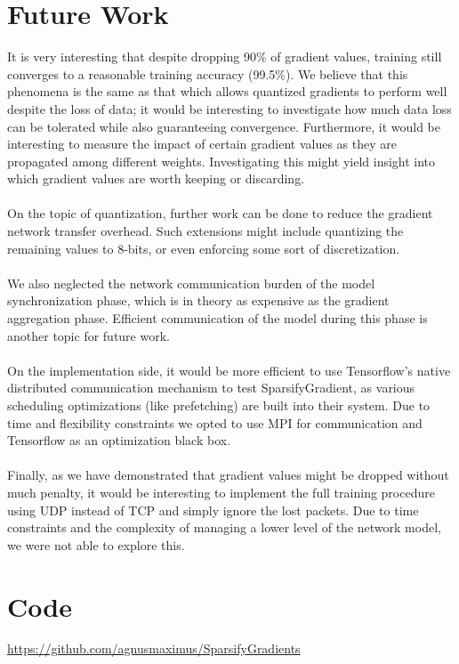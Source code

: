 \documentclass[10pt]{article}
\begin{document}
\section{Future Work}
\label{sec-7}

It is very interesting that despite dropping 90\% of gradient values,
training still converges to a reasonable training accuracy (99.5\%). We
believe that this phenomena is the same as that which allows quantized
gradients to perform well despite the loss of data; it would be
interesting to investigate how much data loss can be tolerated while
also guaranteeing convergence. Furthermore, it would be interesting to
measure the impact of certain gradient values as they are propagated
among different weights. Investigating this might yield insight into which gradient values are worth keeping or discarding.
\\
\\
On the topic of quantization, further work can be done to reduce the
gradient network transfer overhead. Such extensions might include
quantizing the remaining values to 8-bits, or even enforcing some sort
of discretization.
\\
\\
We also neglected the network communication burden of the model
synchronization phase, which is in theory as expensive as the gradient
aggregation phase. Efficient communication of the model during this
phase is another topic for future work.
\\
\\
On the implementation side, it would be more efficient to use Tensorflow's native
distributed communication mechanism to test SparsifyGradient, as various scheduling optimizations (like prefetching)
are built into their system. Due to time and flexibility constraints we
opted to use MPI for communication and Tensorflow as an optimization black box.
\\
\\
Finally, as we have demonstrated that gradient values might be dropped
without much penalty, it would be interesting to implement the full
training procedure using UDP instead of TCP and simply ignore the
lost packets. Due to time constraints and the complexity of managing a
lower level of the network model, we were not able to explore this.

\section{Code}
\label{sec-8}
\url{https://github.com/agnusmaximus/SparsifyGradients}
\end{document}
